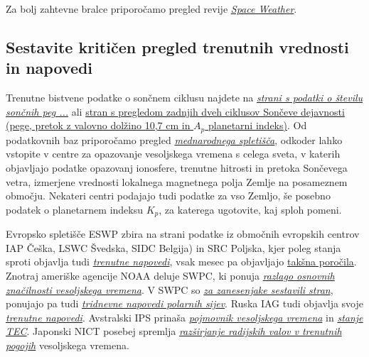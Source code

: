 
 
Za bolj zahtevne bralce priporočamo pregled revije \href{http://agupubs.onlinelibrary.wiley.com/agu/journal/10.1002/(ISSN)1542-7390/}{\textit{Space Weather}}.

\subsection{Sestavite kritičen pregled trenutnih vrednosti in napovedi}
\label{subsec:VesVrem_Podat}
Trenutne bistvene podatke o sončnem ciklusu najdete na \href{http://www.swpc.noaa.gov/SolarCycle/}{\textit{strani s podatki o številu sončnih peg ...}} ali \href{http://www.swpc.noaa.gov/products/solar-cycle-progression}{stran s pregledom zadnjih dveh ciklusov Sončeve dejavnosti (pege, pretok z valovno dolžino 10,7 cm in $A_p$ planetarni indeks)}. Od podatkovnih baz priporočamo pregled  \href{http://www.spaceweather.org/}{\textit{mednarodnega spletišča}}, odkoder lahko vstopite v centre za opazovanje vesoljskega vremena s celega sveta, v katerih objavljajo podatke opazovanj ionosfere, trenutne hitrosti in pretoka Sončevega vetra, izmerjene vrednosti lokalnega magnetnega polja Zemlje na posameznem območju. Nekateri centri podajajo tudi podatke za vso Zemljo, še posebno podatek o planetarnem indeksu $K_p$, za katerega ugotovite, kaj sploh pomeni.

Evropsko spletišče ESWP zbira na strani podatke iz območnih evropskih centrov IAP Češka, LSWC Švedska, SIDC Belgija) in SRC Poljska, kjer poleg stanja sproti objavlja tudi  \href{http://www.spaceweather.eu/sl/nowforecasting}{\textit{trenutne napovedi}}, vsak mesec pa objavljajo \href{http://www.stce.be/newsletter/pdf/2015/STCEnews20151002.pdf}{takšna poročila}. Znotraj ameriške agencije NOAA deluje SWPC, ki ponuja \href{http://www.swpc.noaa.gov/sites/default/files/images/u33/primer_2010_new.pdf}{\textit{razlago osnovnih značilnosti vesoljskega vremena}}. V SWPC so  \href{http://www.swpc.noaa.gov/communities/space-weather-enthusiasts}{\textit{za zanesenjake sestavili stran}}, ponujajo pa tudi \href{http://www.swpc.noaa.gov/products/aurora-3-day-forecast}{\textit{tridnevne napovedi polarnih sijev}}. Ruska IAG tudi objavlja svoje \href{http://www.tesis.lebedev.ru/en/forecast_activity.html}{\textit{trenutne napovedi}}. Avstralski IPS prinaša  \href{www.ips.gov.au}{\textit{pojmovnik vesoljskega vremena}} in \href{http://www.ips.gov.au/Satellite/2/2}{\textit{stanje TEC}}. Japonski NICT posebej spremlja \href{http://wdc.nict.go.jp/IONO/index_E.html}{\textit{razširjanje radijskih valov v trenutnih pogojih}} vesoljskega vremena.


